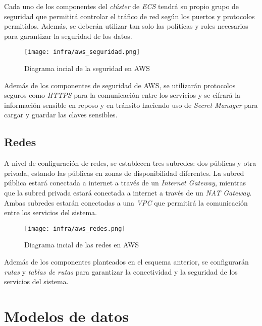 Cada uno de los componentes del \textit{clúster} de \textit{ECS} tendrá su
propio grupo de seguridad que permitirá controlar el tráfico de red según los
puertos y protocolos permitidos. Además, se deberán utilizar tan solo las
políticas y roles necesarios para garantizar la seguridad de los datos.

\begin{figure}[H]
	\centerline{\texttt{[image: infra/aws\_seguridad.png]}}
	\caption{Diagrama incial de la seguridad en AWS}
	\label{fig:aws_seguridad}
\end{figure}

Además de los componentes de seguridad de AWS, se utilizarán protocolos seguros
como \textit{HTTPS} para la comunicación entre los servicios y se cifrará la
información sensible en reposo y en tránsito haciendo uso de
\textit{Secret Manager} para cargar y guardar las claves sensibles.


\subsection{Redes}
A nivel de configuración de redes, se establecen tres subredes: dos públicas y
otra privada, estando las públicas en zonas de disponibilidad diferentes. La
subred pública estará conectada a internet a través de un
\textit{Internet Gateway}, mientras que la subred privada estará conectada a
internet a través de un \textit{NAT Gateway}. Ambas subredes estarán conectadas
a una \textit{VPC} que permitirá la comunicación entre los servicios del
sistema.

\begin{figure}[H]
	\centerline{\texttt{[image: infra/aws\_redes.png]}}
	\caption{Diagrama incial de las redes en AWS}
	\label{fig:aws_redes}
\end{figure}

Además de los componentes planteados en el esquema anterior, se configurarán
\textit{rutas} y \textit{tablas de rutas} para garantizar la conectividad y la
seguridad de los servicios del sistema.


\newpage{}
\section{Modelos de datos}\label{sec:modelo}
